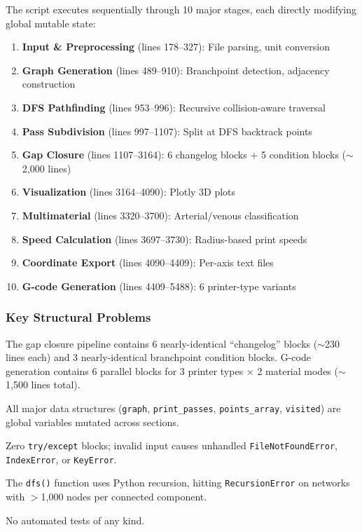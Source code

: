 \documentclass[11pt,a4paper]{article}
\begin{document}
The script executes sequentially through 10 major stages, each directly modifying global mutable state:

\begin{enumerate}[leftmargin=2em]
    \item \textbf{Input \& Preprocessing} (lines 178--327): File parsing, unit conversion
    \item \textbf{Graph Generation} (lines 489--910): Branchpoint detection, adjacency construction
    \item \textbf{DFS Pathfinding} (lines 953--996): Recursive collision-aware traversal
    \item \textbf{Pass Subdivision} (lines 997--1107): Split at DFS backtrack points
    \item \textbf{Gap Closure} (lines 1107--3164): 6 changelog blocks $+$ 5 condition blocks ($\sim$2,000 lines)
    \item \textbf{Visualization} (lines 3164--4090): Plotly 3D plots
    \item \textbf{Multimaterial} (lines 3320--3700): Arterial/venous classification
    \item \textbf{Speed Calculation} (lines 3697--3730): Radius-based print speeds
    \item \textbf{Coordinate Export} (lines 4090--4409): Per-axis text files
    \item \textbf{G-code Generation} (lines 4409--5488): 6 printer-type variants
\end{enumerate}

\subsubsection{Key Structural Problems}

\begin{description}[leftmargin=2em]
    \item[Massive duplication:] The gap closure pipeline contains 6 nearly-identical ``changelog'' blocks ($\sim$230 lines each) and 3 nearly-identical branchpoint condition blocks. G-code generation contains 6 parallel blocks for 3 printer types $\times$ 2 material modes ($\sim$1,500 lines total).
    \item[Global mutable state:] All major data structures (\texttt{graph}, \texttt{print\_passes}, \texttt{points\_array}, \texttt{visited}) are global variables mutated across sections.
    \item[No error handling:] Zero \texttt{try/except} blocks; invalid input causes unhandled \texttt{FileNotFoundError}, \texttt{IndexError}, or \texttt{KeyError}.
    \item[Recursive DFS:] The \texttt{dfs()} function uses Python recursion, hitting \texttt{RecursionError} on networks with $>$1,000 nodes per connected component.
    \item[No tests:] No automated tests of any kind.
\end{description}
\end{document}
